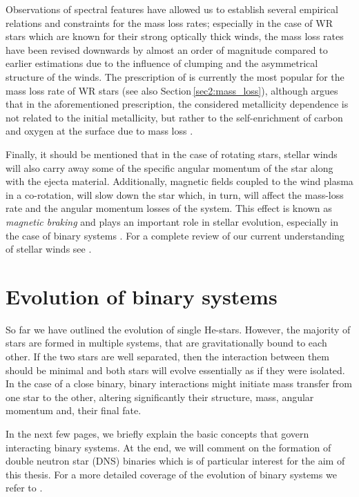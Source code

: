 \documentclass[../../main/thesis_msc.tex]{subfiles}
\begin{document}
						Observations of spectral features have allowed us to establish several empirical relations and constraints for the mass loss rates; especially in the case of WR stars which are known for their strong optically thick winds, the mass loss rates have been revised downwards by almost an order of magnitude \citep{Nugis2000} compared to earlier estimations \citep{Hamann1995, Langer1989} due to the influence of clumping and the asymmetrical structure of the winds. The prescription of \cite{Nugis2000} is currently the most popular for the mass loss rate of WR stars (see also Section\,\ref{sec2:mass_loss}), although \cite{yoon17} argues that in the aforementioned prescription, the considered metallicity dependence is not related to the initial metallicity, but rather to the self-enrichment of carbon and oxygen at the surface due to mass loss \citep[see also][]{Woosley:2019sdf}.
						
						Finally, it should be mentioned that in the case of rotating stars, stellar winds will also carry away some of the specific angular momentum of the star along with the ejecta material. Additionally, magnetic fields coupled to the wind plasma in a co-rotation, will slow down the star which, in turn, will affect the mass-loss rate and the angular momentum losses of the system. This effect is known as \emph{magnetic braking} and plays an important role in stellar evolution, especially in the case of binary systems \citep[see][]{Ivanova2003}. For a complete review of our current understanding of stellar winds see \cite{Lamers, smith14}.
						
					
				
	\section{Evolution of binary systems}
	
		So far we have outlined the evolution of single He-stars. However, the majority of stars are formed in multiple systems, that are gravitationally bound to each other. If the two stars are well separated, then the interaction between them should be minimal and both stars will evolve essentially as if they were isolated. In the case of a close binary, binary interactions might initiate mass transfer from one star to the other, altering significantly their structure, mass, angular momentum and, their final fate.
		
		In the next few pages, we briefly explain the basic concepts that govern interacting binary systems. At the end, we will comment on the formation of double neutron star (DNS) binaries which is of particular interest for the aim of this thesis. For a more detailed coverage of the evolution of binary systems we refer to \cite{Ivanova2015, podsiadlowski_2014, Postnov2014, Eggleton_book, Tauris_2006}.
		
\end{document}
